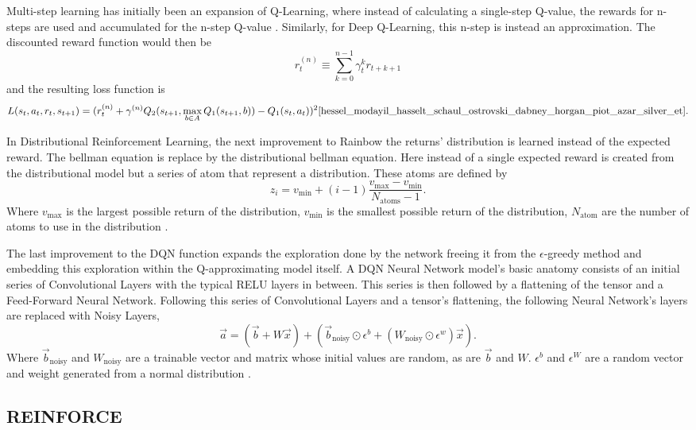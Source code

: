 Multi-step learning has initially been an expansion of Q-Learning, where instead of calculating a single-step Q-value, the rewards for n-steps are used and accumulated for the n-step Q-value \cite{sutton_1988}. Similarly, for Deep Q-Learning, this n-step is instead an approximation. The discounted reward function would then be $$r_t^{(n)}\equiv \sum_{k=0}^{n-1} \gamma_t^k r_{t+k+1}$$ and the resulting loss function is $$L(s_t, a_t, r_t, s_{t+1})=(r_t^{(n)}+\gamma^{(n)} Q_2(s_{t+1}, \max_{b\in A}Q_1(s_{t+1}, b)) - Q_1(s_t, a_t))^2 \cite{hessel_modayil_hasselt_schaul_ostrovski_dabney_horgan_piot_azar_silver_et}.$$
 
In Distributional Reinforcement Learning, the next improvement to Rainbow the returns' distribution is learned instead of the expected reward. The bellman equation is replace by the distributional bellman equation. Here instead of a single expected reward is created from the distributional model but a series of atom that represent a distribution. These atoms are defined by $$z_i=v_{\min} +(i-1)\frac{v_{\max}-v_{\min}}{N_{\text{atoms}}-1}.$$ Where $v_{\max}$ is the largest possible return of the distribution, $v_{\min}$ is the smallest possible return of the distribution, $N_{\text{atom}}$ are the number of atoms to use in the distribution \cite{bellemare_dabney_munos_2017}. 

The last improvement to the DQN function expands the exploration done by the network freeing it from the $\epsilon$-greedy method and embedding this exploration within the Q-approximating model itself. A DQN Neural Network model's basic anatomy consists of an initial series of Convolutional Layers with the typical RELU layers in between. This series is then followed by a flattening of the tensor and a Feed-Forward Neural Network. Following this series of Convolutional Layers and a tensor's flattening, the following Neural Network's layers are replaced with Noisy Layers, $$\vec{a}=(\vec{b}+W\vec{x})+(\vec{b}_{\text{noisy}}\odot \epsilon^b +(W_{\text{noisy}}\odot \epsilon^w)\vec{x}).$$ Where $\vec{b}_{\text{noisy}}$ and $W_{\text{noisy}}$ are a trainable vector and matrix whose initial values are random, as are $\vec{b}$ and $W$. $\epsilon^b$ and $\epsilon^W$ are a random vector and weight generated from a normal distribution \cite{fortunato_azar_piot_menick_osband_graves_mnih_munos_hassabis_pietquin_et}. 

\subsection{REINFORCE}\label{subsec:reinforce}

